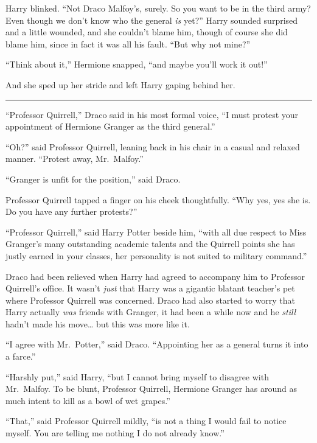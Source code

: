Harry blinked. ``Not Draco Malfoy's, surely. So you want to be in the
third army? Even though we don't know who the general \emph{is} yet?''
Harry sounded surprised and a little wounded, and she couldn't blame
him, though of course she did blame him, since in fact it was all his
fault. ``But why not mine?''

``Think about it,'' Hermione snapped, ``and maybe you'll work it out!''

And she sped up her stride and left Harry gaping behind her.

\begin{center}\rule{3in}{0.4pt}\end{center}

``Professor Quirrell,'' Draco said in his most formal voice, ``I must
protest your appointment of Hermione Granger as the third general.''

``Oh?'' said Professor Quirrell, leaning back in his chair in a casual
and relaxed manner. ``Protest away, Mr.~Malfoy.''

``Granger is unfit for the position,'' said Draco.

Professor Quirrell tapped a finger on his cheek thoughtfully. ``Why yes,
yes she is. Do you have any further protests?''

``Professor Quirrell,'' said Harry Potter beside him, ``with all due
respect to Miss Granger's many outstanding academic talents and the
Quirrell points she has justly earned in your classes, her personality
is not suited to military command.''

Draco had been relieved when Harry had agreed to accompany him to
Professor Quirrell's office. It wasn't \emph{just} that Harry was a
gigantic blatant teacher's pet where Professor Quirrell was concerned.
Draco had also started to worry that Harry actually \emph{was} friends
with Granger, it had been a while now and he \emph{still} hadn't made
his move\ldots{} but this was more like it.

``I agree with Mr.~Potter,'' said Draco. ``Appointing her as a general
turns it into a farce.''

``Harshly put,'' said Harry, ``but I cannot bring myself to disagree
with Mr.~Malfoy. To be blunt, Professor Quirrell, Hermione Granger has
around as much intent to kill as a bowl of wet grapes.''

``That,'' said Professor Quirrell mildly, ``is not a thing I would fail
to notice myself. You are telling me nothing I do not already know.''

